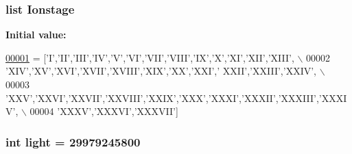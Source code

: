 \subsubsection[{Ionstage}]{\setlength{\rightskip}{0pt plus 5cm}list Ionstage}\label{namespacepyneb_1_1utils_1_1__chianti__constants_a6ba3a6e6b5b9a7296dcff5cd8655c88b}
{\bfseries Initial value\+:}
\begin{DoxyCode}
\hypertarget{namespacepyneb_1_1utils_1_1__chianti__constants_l00001}{}\hyperlink{namespacepyneb_1_1utils_1_1__chianti__constants}{00001} = [\textcolor{stringliteral}{'I'},\textcolor{stringliteral}{'II'},\textcolor{stringliteral}{'III'},\textcolor{stringliteral}{'IV'},\textcolor{stringliteral}{'V'},\textcolor{stringliteral}{'VI'},\textcolor{stringliteral}{'VII'},\textcolor{stringliteral}{'VIII'},\textcolor{stringliteral}{'IX'},\textcolor{stringliteral}{'X'},\textcolor{stringliteral}{'XI'},\textcolor{stringliteral}{'XII'},\textcolor{stringliteral}{'XIII'}, \(\backslash\)
00002     \textcolor{stringliteral}{'XIV'},\textcolor{stringliteral}{'XV'},\textcolor{stringliteral}{'XVI'},\textcolor{stringliteral}{'XVII'},\textcolor{stringliteral}{'XVIII'},\textcolor{stringliteral}{'XIX'},\textcolor{stringliteral}{'XX'},\textcolor{stringliteral}{'XXI'},\textcolor{stringliteral}{' XXII'},\textcolor{stringliteral}{'XXIII'},\textcolor{stringliteral}{'XXIV'}, \(\backslash\)
00003     \textcolor{stringliteral}{'XXV'},\textcolor{stringliteral}{'XXVI'},\textcolor{stringliteral}{'XXVII'},\textcolor{stringliteral}{'XXVIII'},\textcolor{stringliteral}{'XXIX'},\textcolor{stringliteral}{'XXX'},\textcolor{stringliteral}{'XXXI'},\textcolor{stringliteral}{'XXXII'},\textcolor{stringliteral}{'XXXIII'},\textcolor{stringliteral}{'XXXIV'}, \(\backslash\)
00004     \textcolor{stringliteral}{'XXXV'},\textcolor{stringliteral}{'XXXVI'},\textcolor{stringliteral}{'XXXVII'}]
\end{DoxyCode}
\hypertarget{namespacepyneb_1_1utils_1_1__chianti__constants_a840d98f11adfbaeeb77afa32ceb0e278}{}
\subsubsection[{light}]{\setlength{\rightskip}{0pt plus 5cm}int light = 29979245800}\label{namespacepyneb_1_1utils_1_1__chianti__constants_a840d98f11adfbaeeb77afa32ceb0e278}
\hypertarget{namespacepyneb_1_1utils_1_1__chianti__constants_a74129ca1782b05e6a444edf78f27e6fa}{}
